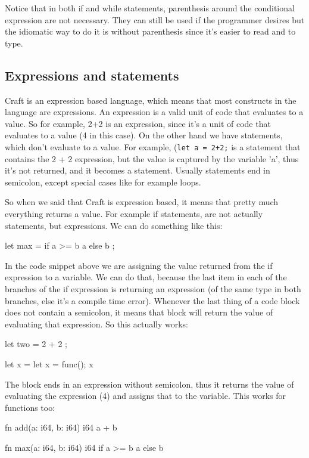﻿\documentclass[10pt,a4paper,twocolumn,twoside]{article}
\begin{document}
Notice that in both if and while statements, parenthesis around the conditional 
expression are not necessary. They can still be used if the programmer desires
but the idiomatic way to do it is without parenthesis since it's easier to read 
and to type.

\subsection{Expressions and statements}
Craft is an expression based language, which means that most constructs in the
language are expressions. An expression is a valid unit of code that evaluates
to a value. So for example, 2+2 is an expression, since it's a unit of code that
evaluates to a value (4 in this case). On the other hand we have statements,
which don't evaluate to a value. For example, (\texttt{let a = 2+2;} is a
statement that contains the 2 + 2 expression, but the value is captured by the
variable 'a', thus it's not returned, and it becomes a statement. Usually
statements end in semicolon, except special cases like for example loops.

So when we said that Craft is expression based, it means that pretty much
everything returns a value. For example if statements, are not actually
statements, but expressions. We can do something like this:

\begin{code}
    let max = if a >= b { a } else { b };
\end{code}

In the code snippet above we are assigning the value returned from the if
expression to a variable. We can do that, because the last item in each of the
branches of the if expression is returning an expression (of the same type in
both branches, else it's a compile time error). Whenever the last thing of a
code block does not contain a semicolon, it means that block will return the
value of evaluating that expression. So this actually works: 

\begin{code}
    let two = {
        2 + 2
    };

    let x = {
        let x = func();
        x
    }
\end{code}

The block ends in an expression without semicolon, thus it returns the value of
evaluating the expression (4) and assigns that to the variable. This works for 
functions too:

\begin{code}
    fn add(a: i64, b: i64) i64 {
        a + b
    }

    fn max(a: i64, b: i64) i64 {
        if a >= b { a } else { b }
    }
\end{code}
\end{document}
